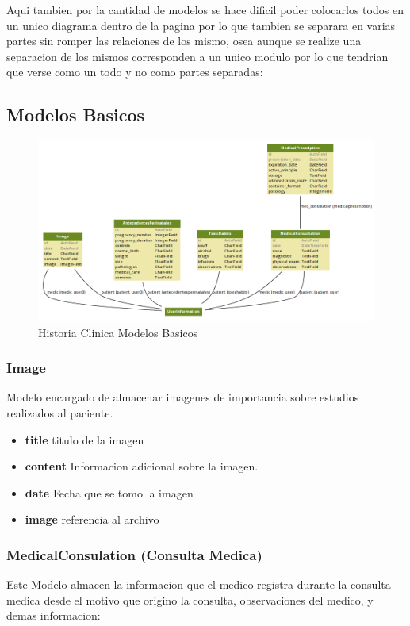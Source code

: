 Aqui tambien por la cantidad de modelos se hace dificil poder colocarlos todos 
en un unico diagrama dentro de la pagina por lo que tambien se separara en 
varias partes sin romper las relaciones de los mismo, osea aunque se realize 
una separacion de los mismos corresponden a un unico modulo por lo que tendrian 
que verse como un todo y no como partes separadas: \\[0.1cm]


\subsection{Modelos Basicos}

\begin{figure}[H]
    \centering
    \includegraphics[scale=0.4]{resourse/hc1.png}
    \caption{Historia Clinica Modelos Basicos}
    \label{fig:hc3}
\end{figure} 

\subsubsection{Image}
Modelo encargado de almacenar imagenes de importancia sobre estudios realizados
al paciente.

\begin{itemize}
    \item \textbf{title} titulo de la imagen
    \item \textbf{content} Informacion adicional sobre la imagen.
    \item \textbf{date} Fecha que se tomo la imagen
    \item \textbf{image} referencia al archivo 
\end{itemize}

\subsubsection{MedicalConsulation (Consulta Medica)}
Este Modelo almacen la informacion que el medico registra durante la consulta
medica desde el motivo que origino la consulta, observaciones del medico, y
demas informacion:

